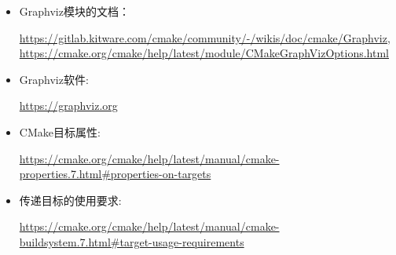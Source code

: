 

\begin{itemize}
\item
Graphviz模块的文档：

\url{https://gitlab.kitware.com/cmake/community/-/wikis/doc/cmake/Graphviz}, \url{https://cmake.org/cmake/help/latest/module/CMakeGraphVizOptions.html}

\item
Graphviz软件:

\url{https://graphviz.org}

\item
CMake目标属性:

\url{https://cmake.org/cmake/help/latest/manual/cmake-properties.7.html#properties-on-targets}

\item
传递目标的使用要求:

\url{https://cmake.org/cmake/help/latest/manual/cmake-buildsystem.7.html#target-usage-requirements}
\end{itemize}





















